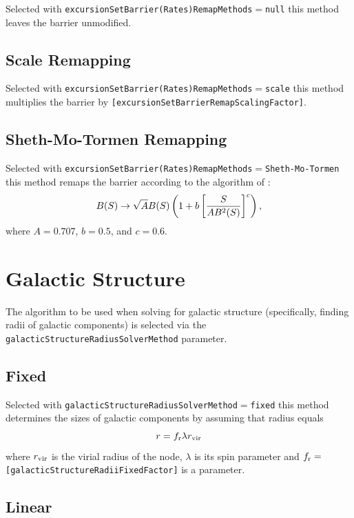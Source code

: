Selected with {\tt excursionSetBarrier(Rates)RemapMethods}$=${\tt null} this method leaves the barrier unmodified.

\subsection{Scale Remapping}

Selected with {\tt excursionSetBarrier(Rates)RemapMethods}$=${\tt scale} this method multiplies the barrier by {\tt [excursionSetBarrierRemapScalingFactor]}.

\subsection{Sheth-Mo-Tormen Remapping}

Selected with {\tt excursionSetBarrier(Rates)RemapMethods}$=${\tt Sheth-Mo-Tormen} this method remaps the barrier according to the algorithm of \cite{sheth_ellipsoidal_2001}:
\begin{equation}
 B(S) \rightarrow \sqrt{A} B(S) \left(1 + b \left[ {S \over A B^2(S)}\right]^c\right),
\end{equation}
where $A=0.707$, $b=0.5$, and $c=0.6$.

\section{Galactic Structure}

The algorithm to be used when solving for galactic structure (specifically, finding radii of galactic components) is selected via the {\tt galacticStructureRadiusSolverMethod} parameter.

\subsection{Fixed}

Selected with {\tt galacticStructureRadiusSolverMethod}$=${\tt fixed} this method determines the sizes of galactic components by assuming that radius equals
\begin{equation}
 r = f_{\rm r} \lambda r_{\rm vir}
\end{equation}
where $r_{\rm vir}$ is the virial radius of the \gls{node}, $\lambda$ is its spin parameter and $f_{\rm r}=${\tt [galacticStructureRadiiFixedFactor]} is a parameter.

\subsection{Linear}

